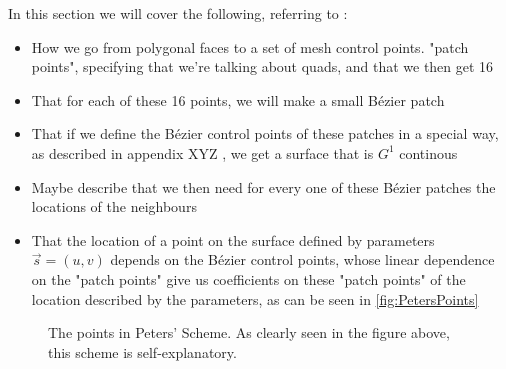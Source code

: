 In this section we will cover the following, referring to \cite{peters1992constructing}:
\begin{itemize}
\item How we go from polygonal faces to a set of mesh control points. "patch points", specifying that we're talking about quads, and that we then get 16
\item That for each of these 16 points, we will make a small B{\'e}zier patch
\item That if we define the B{\'e}zier control points of these patches in a special way, as described in appendix XYZ , we get a surface that is $G^1$ continous
\item Maybe describe that we then need for every one of these B{\'e}zier patches the locations of the neighbours
\item That the location of a point on the surface defined by parameters $\vec{s} = (u,v)$ depends on the B{\'e}zier control points, whose linear dependence on the "patch points" give us coefficients on these "patch points" of the location described by the parameters, as can be seen in \autoref{fig:PetersPoints}

\end{itemize}
\begin{figure}

\label{fig:PetersPoints}
\caption{The points in Peters' Scheme. As clearly seen in the figure above, this scheme is self-explanatory.}
\end{figure}